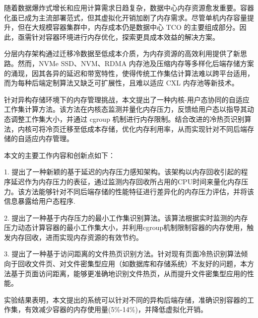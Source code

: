 	
\begin{chineseabstract}

随着数据爆炸式增长和应用计算需求日趋复杂，数据中心内存资源愈发重要。容器化虽已成为主流部署范式，但其虚拟化开销加剧了内存需求。尽管单机内存容量提升，但在大规模容器集群中，内存成本仍是数据中心 TCO 的主要组成部分。因此，亟需针对容器环境进行内存优化，探索更具成本效益的解决方案。

分层内存架构通过迁移冷数据至低成本介质，为内存资源的高效利用提供了新思路。然而，NVMe SSD、NVM、RDMA 内存池及压缩内存等多样化后端存储方案的涌现，因其各异的延迟和带宽特性，使得传统工作集估计算法难以跨平台适用，而为每种后端定制算法又缺乏可扩展性，且难以适应 CXL 内存池等新技术。

针对异构存储环境下的内存管理挑战，本文提出了一种内核-用户态协同的自适应工作集计算方法。该方法在内核态监测并量化内存压力，反馈给用户态以指导其动态调整工作集大小，并通过 cgroup 机制进行内存限制。结合改进的冷热页识别算法，内核可将冷页迁移至低成本存储，优化内存利用率，从而实现针对不同后端存储的自适应内存管理。

本文的主要工作内容和创新点如下：

1. 提出了一种新颖的基于延迟的内存压力感知架构。该架构以内存回收引起的程序延迟作为内存压力的表征，通过监测内存回收所占用的CPU时间来量化内存压力。该方法能够针对不同后端存储的性能特征进行差异化的内存压力评估，并将该信息暴露给用户态程序.

2. 提出了一种基于内存压力的最小工作集识别算法。该算法根据实时监测的内存压力动态计算容器的最小工作集大小，并利用cgroup机制限制容器的内存使用，触发内存回收，进而实现内存资源的有效节约。

3. 提出了一种基于访问距离的文件热页识别方法。针对现有页面冷热识别算法倾向于回收文件页、对文件密集型应用（如数据库和存储系统）不友好的问题，本方法基于页面访问距离，能够更准确地识别文件热页，从而提升文件密集型应用的性能。

实验结果表明，本文提出的系统可以针对不同的异构后端存储，准确识别容器的工作集，有效减少容器的内存使用量(5\%-14\%)，并降低虚拟化开销。

\end{chineseabstract}